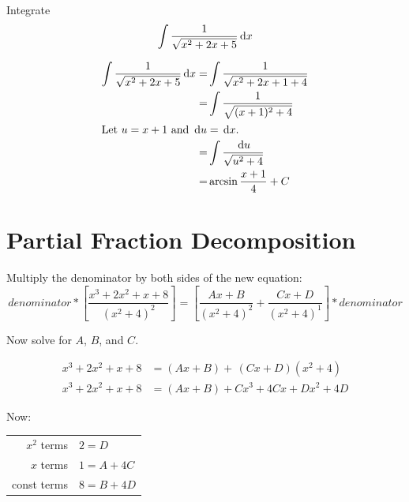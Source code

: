 \begin{ex}
  Integrate
    \[ \int \frac{1}{\sqrt{x^2+2x+5}}\,\mathrm{d} x \]
  \begin{sol}
    \begin{align*}
      \int \frac{1}{\sqrt{x^2+2x+5}}\,\mathrm{d} x
      =& \int \frac{1}{\sqrt{x^2+2x+1+4}} \\
      =& \int \frac{1}{\sqrt{(x+1)^2+4}} \\
      \intertext{Let $u=x+1$ and $\,\mathrm{d} u=\,\mathrm{d} x$.}
      =& \int \frac{\,\mathrm{d} u}{\sqrt{u^2+4}} \\
      =& \arcsin \frac{x+1}{4}+C
    \end{align*}
  \end{sol}
\end{ex}


\section{Partial Fraction Decomposition}

Multiply the denominator by both sides of the new equation:
\[ {denominator}*\left[\frac{x^3+2x^2+x+8}{(x^2+4)^2}\right]=\left[\frac{Ax+B}{(x^2+4)^2}+\frac{Cx+D}{(x^2+4)^1}\right]*{denominator} \]

Now solve for \(A\), \(B\), and \(C\).

\begin{align*}
  x^3+2x^2+x+8 &= (Ax+B)+\,(Cx+D)(x^2+4)\\
  x^3+2x^2+x+8 &= (Ax+B)+Cx^3+4Cx+Dx^2+4D
\end{align*}

Now:
\begin{table}[H]
  \centering
  \begin{tabular}{r|l}
    \(x^2\) terms & \( 2=D \) \\
    \(x\) terms & \( 1 = A + 4C  \) \\
    const terms & \( 8 = B + 4D \)
  \end{tabular}
\end{table}

